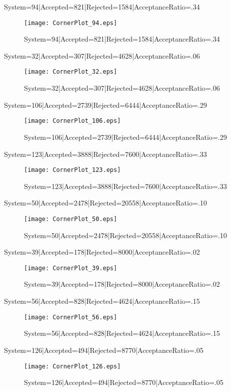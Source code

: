 \documentclass[10pt]{article}
\begin{document}
System=94|Accepted=821|Rejected=1584|AcceptanceRatio=.34
\begin{figure}[h]
\texttt{[image: CornerPlot\_94.eps]}
\caption{System=94|Accepted=821|Rejected=1584|AcceptanceRatio=.34}
\label{S94}
\centering
\end{figure}

System=32|Accepted=307|Rejected=4628|AcceptanceRatio=.06
\begin{figure}[h]
\texttt{[image: CornerPlot\_32.eps]}
\caption{System=32|Accepted=307|Rejected=4628|AcceptanceRatio=.06}
\label{S32}
\centering
\end{figure}

System=106|Accepted=2739|Rejected=6444|AcceptanceRatio=.29
\begin{figure}[h]
\texttt{[image: CornerPlot\_106.eps]}
\caption{System=106|Accepted=2739|Rejected=6444|AcceptanceRatio=.29}
\label{S106}
\centering
\end{figure}

System=123|Accepted=3888|Rejected=7600|AcceptanceRatio=.33
\begin{figure}[h]
\texttt{[image: CornerPlot\_123.eps]}
\caption{System=123|Accepted=3888|Rejected=7600|AcceptanceRatio=.33}
\label{S123}
\centering
\end{figure}

System=50|Accepted=2478|Rejected=20558|AcceptanceRatio=.10
\begin{figure}[h]
\texttt{[image: CornerPlot\_50.eps]}
\caption{System=50|Accepted=2478|Rejected=20558|AcceptanceRatio=.10}
\label{S50}
\centering
\end{figure}

System=39|Accepted=178|Rejected=8000|AcceptanceRatio=.02
\begin{figure}[h]
\texttt{[image: CornerPlot\_39.eps]}
\caption{System=39|Accepted=178|Rejected=8000|AcceptanceRatio=.02}
\label{S39}
\centering
\end{figure}

System=56|Accepted=828|Rejected=4624|AcceptanceRatio=.15
\begin{figure}[h]
\texttt{[image: CornerPlot\_56.eps]}
\caption{System=56|Accepted=828|Rejected=4624|AcceptanceRatio=.15}
\label{S56}
\centering
\end{figure}

System=126|Accepted=494|Rejected=8770|AcceptanceRatio=.05
\begin{figure}[h]
\texttt{[image: CornerPlot\_126.eps]}
\caption{System=126|Accepted=494|Rejected=8770|AcceptanceRatio=.05}
\label{S126}
\centering
\end{figure}
\end{document}
